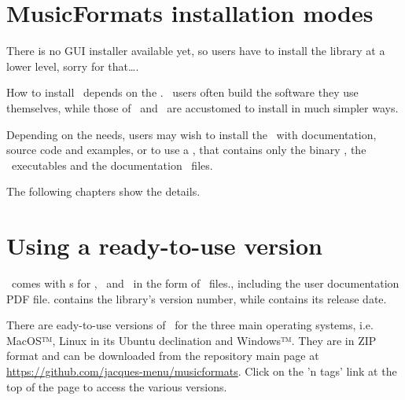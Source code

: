 



\chapter{MusicFormats installation modes}

There is no GUI installer available yet, so users have to install the library at a lower level, sorry for that\dots.

How to install \mf\ depends on the \OS. \Linux\ users often build the software they use themselves, while those of \Windows\ and \MacOS\ are accustomed to install in much simpler ways.

Depending on the needs, users may wish to install the  \mf\ with documentation, source code and examples, or to use a {\it \readyToUseVersion}, that contains only the binary , the \CLI\ executables and the documentation \pdf\ files.

The following chapters show the details.


\chapter{Using a ready-to-use version}

\mf\ comes with  \readyToUseVersion s for \MacOS, \Ubuntu\ and \Windows\ in the form of \zip\ files., including the user documentation PDF file.  contains the library's version number, while  contains its release date.


There are eady-to-use versions of \mf\ for the three main operating systems,
i.e. MacOS™, Linux in its Ubuntu declination and Windows™.
They are in ZIP format and can be downloaded from the repository main page at
\url{https://github.com/jacques-menu/musicformats}.
Click on the 'n tags' link at the top of the page to access the various versions.

